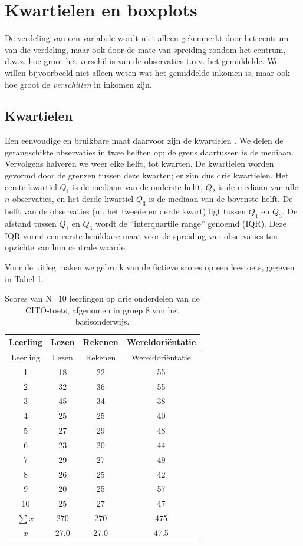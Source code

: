 \documentclass[
]{book}
\begin{document}
\hypertarget{sec:kwartielen-en-boxplots}{%
\section{Kwartielen en boxplots}\label{sec:kwartielen-en-boxplots}}

De verdeling van een variabele wordt niet alleen gekenmerkt door het
centrum van die verdeling, maar ook door de mate van spreiding rondom
het centrum, d.w.z. hoe groot het verschil is van de observaties t.o.v.
het gemiddelde. We willen bijvoorbeeld niet alleen weten wat het
gemiddelde inkomen is, maar ook hoe groot de \emph{verschillen} in inkomen
zijn.

\hypertarget{kwartielen}{%
\subsection{Kwartielen}\label{kwartielen}}

Een eenvoudige en bruikbare maat daarvoor zijn de kwartielen \citep{Tukey77}.
We delen de gerangschikte observaties in twee helften op; de grens
daartussen is de mediaan. Vervolgens halveren we weer elke helft, tot
kwarten. De kwartielen worden gevormd door de grenzen tussen deze
kwarten; er zijn dus drie kwartielen. Het eerste kwartiel \(Q_1\) is de
mediaan van de onderste helft, \(Q_2\) is de mediaan van alle \(n\)
observaties, en het derde kwartiel \(Q_3\) is de mediaan van de bovenste
helft. De helft van de observaties (nl. het tweede en derde kwart) ligt
tussen \(Q_1\) en \(Q_3\). De afstand tussen \(Q_1\) en \(Q_3\) wordt de
``interquartile range'' genoemd (IQR). Deze IQR vormt een eerste bruikbare
maat voor de spreiding van observaties ten opzichte van hun centrale
waarde.

Voor de uitleg maken we gebruik van de fictieve scores op een leestoets,
gegeven in Tabel \ref{tab:cito}.

\begin{longtable}[]{@{}cccc@{}}
\caption{\label{tab:cito} Scores van N=10 leerlingen op drie onderdelen van de CITO-toets,
afgenomen in groep 8 van het basisonderwijs.}\tabularnewline
\toprule
Leerling & Lezen & Rekenen & Wereldoriëntatie\tabularnewline
\midrule
\endfirsthead
\toprule
Leerling & Lezen & Rekenen & Wereldoriëntatie\tabularnewline
\midrule
\endhead
1 & 18 & 22 & 55\tabularnewline
2 & 32 & 36 & 55\tabularnewline
3 & 45 & 34 & 38\tabularnewline
4 & 25 & 25 & 40\tabularnewline
5 & 27 & 29 & 48\tabularnewline
6 & 23 & 20 & 44\tabularnewline
7 & 29 & 27 & 49\tabularnewline
8 & 26 & 25 & 42\tabularnewline
9 & 20 & 25 & 57\tabularnewline
10 & 25 & 27 & 47\tabularnewline
\(\sum x\) & 270 & 270 & 475\tabularnewline
\(\overline{x}\) & 27.0 & 27.0 & 47.5\tabularnewline
\bottomrule
\end{longtable}
\end{document}
